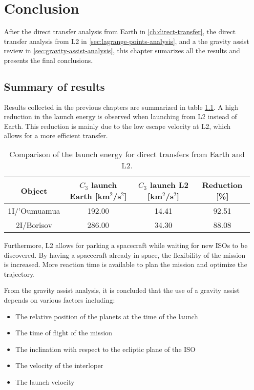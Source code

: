 \chapter{Conclusion}

After the direct transfer analysis from Earth in \ref{ch:direct-transfer}, the
direct transfer analysis from L2 in \ref{sec:lagrange-points-analysis}, and a
the gravity assist review in \ref{sec:gravity-assist-analysis}, this chapter
sumarizes all the results and presents the final conclusions.

\section{Summary of results}

Results collected in the previous chapters are summarized in table
\ref{tab:summary-results-c3}. A high reduction in the launch energy is observed
when launching from L2 instead of Earth. This reduction is mainly due to the low
escape velocity at L2, which allows for a more efficient transfer.

\vspace{1cm}
\begin{table}[H]
  \centering
  \begin{tabular}{|c|c|c|c|}
    \hline
    Object & $C_3$ launch Earth [km$^2$/s$^2$] & $C_3$ launch L2 [km$^2$/s$^2$] & Reduction [\%] \\
    \hline
    1I/'Oumuamua & 192.00 & 14.41 & 92.51 \\
    \hline
    2I/Borisov & 286.00 & 34.30 & 88.08 \\
    \hline
  \end{tabular}
  \caption[Comparison of the launch energy for direct transfers from Earth and
  L2.]{Comparison of the launch energy for direct transfers from Earth and L2.}
  \label{tab:summary-results-c3}
\end{table}

Furthermore, L2 allows for parking a spacecraft while waiting for new ISOs to be
discovered. By having a spacecraft already in space, the flexibility of the
mission is increased. More reaction time is available to plan the mission and
optimize the trajectory.

From the gravity assist analysis, it is concluded that the use of a gravity
assist depends on various factors including:

\begin{itemize}
  \item The relative position of the planets at the time of the launch
  \item The time of flight of the mission
  \item The inclination with respect to the ecliptic plane of the ISO
  \item The velocity of the interloper
  \item The launch velocity
\end{itemize}

